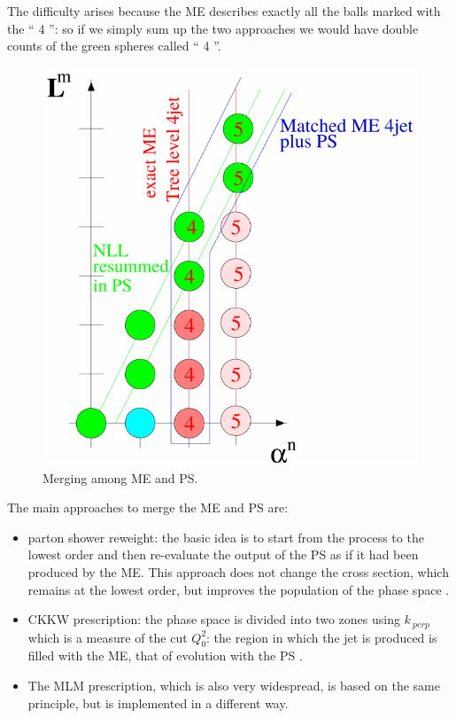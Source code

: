 The difficulty arises because the ME describes exactly all the balls marked with the `` 4 '': so if we simply sum up the two approaches we would have double counts of the green spheres called `` 4 ''.
\begin{figure}
\centering
\includegraphics[scale= 0.7]{../Cap3/Fig_MC/merge}
\caption{ Merging among ME and PS.}
\label{merge}
\end{figure}
The main approaches to merge the  ME and PS are:
\begin{itemize}
\item  parton shower reweight: the basic idea is to start from the process to the lowest order and then re-evaluate the output of the PS as if it had been produced by the ME. This approach does not change the cross section, which remains at the lowest order, but improves the population of the phase space \cite{ripesamento, ripesamento2}.
\item  CKKW prescription: the phase space is divided into two zones using $ k _ {\ perp} $ which is a measure of the cut $ Q_0 ^ 2 $: the region in which the jet is produced is filled with the ME, that of evolution with the PS \cite{ckkw, ckkw2}. 
\item The MLM prescription, which is also very widespread, is based on the same principle, but is implemented in a different way.
\end{itemize}

